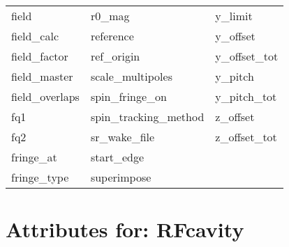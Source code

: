 \begin{tabular}{lll}
field                       & r0_mag                      & y_limit                     \\
field_calc                  & reference                   & y_offset                    \\
field_factor                & ref_origin                  & y_offset_tot                \\
field_master                & scale_multipoles            & y_pitch                     \\
field_overlaps              & spin_fringe_on              & y_pitch_tot                 \\
fq1                         & spin_tracking_method        & z_offset                    \\
fq2                         & sr_wake_file                & z_offset_tot                \\
fringe_at                   & start_edge                  &                             \\
fringe_type                 & superimpose                 &                             \\
 \bottomrule
 \end{tabular}
 \vfill
 
 \section{Attributes for: RFcavity}
 \label{s:list.rfcavity}
 
